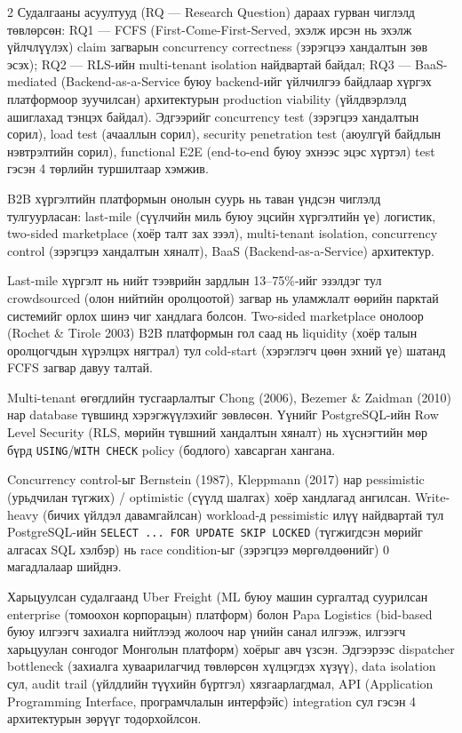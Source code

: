 \begin{multicols}{2}
Судалгааны асуултууд (RQ --- Research Question) дараах гурван чиглэлд төвлөрсөн: RQ1 — FCFS (First-Come-First-Served, эхэлж ирсэн нь эхэлж үйлчлүүлэх) claim загварын concurrency correctness (зэрэгцээ хандалтын зөв эсэх); RQ2 — RLS-ийн multi-tenant isolation найдвартай байдал; RQ3 — BaaS-mediated (Backend-as-a-Service буюу backend-ийг үйлчилгээ байдлаар хүргэх платформоор зуучилсан) архитектурын production viability (үйлдвэрлэлд ашиглахад тэнцэх байдал). Эдгээрийг concurrency test (зэрэгцээ хандалтын сорил), load test (ачааллын сорил), security penetration test (аюулгүй байдлын нэвтрэлтийн сорил), functional E2E (end-to-end буюу эхнээс эцэс хүртэл) test гэсэн 4 төрлийн туршилтаар хэмжив.


B2B хүргэлтийн платформын онолын суурь нь таван үндсэн чиглэлд тулгуурласан: last-mile (сүүлчийн миль буюу эцсийн хүргэлтийн үе) логистик, two-sided marketplace (хоёр талт зах зээл), multi-tenant isolation, concurrency control (зэрэгцээ хандалтын хяналт), BaaS (Backend-as-a-Service) архитектур.

Last-mile хүргэлт нь нийт тээврийн зардлын 13--75\%-ийг эзэлдэг тул crowdsourced (олон нийтийн оролцоотой) загвар нь уламжлалт өөрийн парктай системийг орлох шинэ чиг хандлага болсон. Two-sided marketplace онолоор (Rochet \& Tirole 2003) B2B платформын гол саад нь liquidity (хоёр талын оролцогчдын хүрэлцэх нягтрал) тул cold-start (хэрэглэгч цөөн эхний үе) шатанд FCFS загвар давуу талтай.

Multi-tenant өгөгдлийн тусгаарлалтыг Chong (2006), Bezemer \& Zaidman (2010) нар database түвшинд хэрэгжүүлэхийг зөвлөсөн. Үүнийг PostgreSQL-ийн Row Level Security (RLS, мөрийн түвшний хандалтын хяналт) нь хүснэгтийн мөр бүрд \texttt{USING}/\texttt{WITH CHECK} policy (бодлого) хавсарган хангана.

Concurrency control-ыг Bernstein (1987), Kleppmann (2017) нар pessimistic (урьдчилан түгжих) / optimistic (сүүлд шалгах) хоёр хандлагад ангилсан. Write-heavy (бичих үйлдэл давамгайлсан) workload-д pessimistic илүү найдвартай тул PostgreSQL-ийн \texttt{SELECT ... FOR UPDATE SKIP LOCKED} (түгжигдсэн мөрийг алгасах SQL хэлбэр) нь race condition-ыг (зэрэгцээ мөргөлдөөнийг) 0 магадлалаар шийднэ.

Харьцуулсан судалгаанд Uber Freight (ML буюу машин сургалтад суурилсан enterprise (томоохон корпорацын) платформ) болон Papa Logistics (bid-based буюу илгээгч захиалга нийтлээд жолооч нар үнийн санал илгээж, илгээгч харьцуулан сонгодог Монголын платформ) хоёрыг авч үзсэн. Эдгээрээс dispatcher bottleneck (захиалга хуваарилагчид төвлөрсөн хүлцэгдэх хүзүү), data isolation сул, audit trail (үйлдлийн түүхийн бүртгэл) хязгаарлагдмал, API (Application Programming Interface, програмчлалын интерфэйс) integration сул гэсэн 4 архитектурын зөрүүг тодорхойлсон.


\end{multicols}
